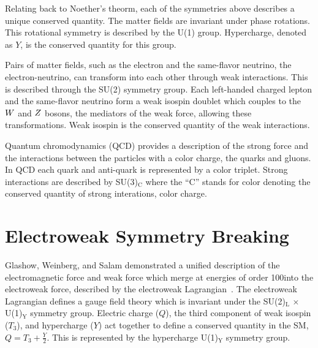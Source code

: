 
Relating back to Noether's theorm, each of the symmetries above describes a unique conserved
quantity. The matter fields are invariant under phase rotations. This rotational symmetry is described by the U(1) group.
Hypercharge, denoted as $Y$, is the conserved quantity for this group.

Pairs of matter fields, such as the electron and the same-flavor neutrino, the electron-neutrino, can transform into each other 
through weak interactions. This is described through the SU(2) symmetry group. Each left-handed charged lepton 
and the same-flavor neutrino form a weak isospin doublet which
couples to the $W$ and $Z$ bosons, the mediators of the weak force, allowing these transformations.
Weak isospin is the conserved quantity of the weak interactions.

Quantum chromodynamics (QCD) provides a description of the strong force and the interactions
between the particles with a color charge, the quarks and gluons. In QCD each quark and anti-quark
is represented by a color triplet. Strong interactions are described by SU(3)$_{\text{C}}$
where the ``C'' stands for color denoting the conserved quantity of strong interations,
color charge.



\section{Electroweak Symmetry Breaking}
Glashow, Weinberg, and Salam demonstrated a unified description of the electromagnetic force 
and weak force which merge at energies of order 100\GeV into the electroweak force,
described by the electroweak Lagrangian~\cite{Glashow:1961tr,SM1,SM3}.
The electroweak Lagrangian defines a gauge field theory which is 
invariant under the SU(2)$_{\text{L}} \, \times \, $U(1)$_{\text{Y}}$ symmetry group. 
Electric charge ($Q$), the third component of weak isospin ($T_{3}$), and hypercharge ($Y$) act together to define a conserved 
quantity in the SM, $Q = T_{3} + \frac{Y}{2}$. This is represented by the
hypercharge U(1)$_{\text{Y}}$ symmetry group.

